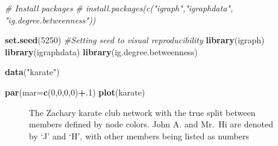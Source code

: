 \documentclass[10pt,a4paper,onecolumn]{article}
\newenvironment{Shaded}{\begin{snugshade}}{\end{snugshade}}
\newcommand{\AttributeTok}[1]{\textcolor[rgb]{0.13,0.29,0.53}{#1}}
\newcommand{\CommentTok}[1]{\textcolor[rgb]{0.56,0.35,0.01}{\textit{#1}}}
\newcommand{\DecValTok}[1]{\textcolor[rgb]{0.00,0.00,0.81}{#1}}
\newcommand{\FunctionTok}[1]{\textcolor[rgb]{0.13,0.29,0.53}{\textbf{#1}}}
\newcommand{\NormalTok}[1]{#1}
\newcommand{\SpecialCharTok}[1]{\textcolor[rgb]{0.81,0.36,0.00}{\textbf{#1}}}
\newcommand{\StringTok}[1]{\textcolor[rgb]{0.31,0.60,0.02}{#1}}
\begin{document}
\begin{Shaded}
\begin{Highlighting}[]
\CommentTok{\# Install packages}
\CommentTok{\# install.packages(c("igraph","igraphdata", "ig.degree.betweenness"))}

\FunctionTok{set.seed}\NormalTok{(}\DecValTok{5250}\NormalTok{) }\CommentTok{\#Setting seed to visual reproducibility}
\FunctionTok{library}\NormalTok{(igraph)}
\FunctionTok{library}\NormalTok{(igraphdata)}
\FunctionTok{library}\NormalTok{(ig.degree.betweenness)}

\FunctionTok{data}\NormalTok{(}\StringTok{"karate"}\NormalTok{)}

\FunctionTok{par}\NormalTok{(}\AttributeTok{mar=}\FunctionTok{c}\NormalTok{(}\DecValTok{0}\NormalTok{,}\DecValTok{0}\NormalTok{,}\DecValTok{0}\NormalTok{,}\DecValTok{0}\NormalTok{)}\SpecialCharTok{+}\NormalTok{.}\DecValTok{1}\NormalTok{)}
\FunctionTok{plot}\NormalTok{(karate)}
\end{Highlighting}
\end{Shaded}

\begin{figure}
\centering
{}
\caption{The Zachary karate club network with the true split between
members defined by node colors. John A. and Mr.~Hi are denoted by `J'
and `H', with other members being listed as numbers}
\end{figure}
\end{document}

